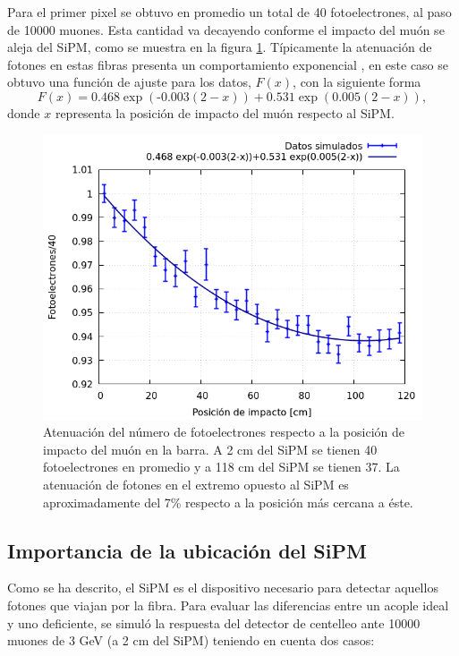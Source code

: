 \documentclass[12pt,oneside,openany,letter]{book}
\begin{document}
Para el primer pixel se obtuvo en promedio un total de 40 fotoelectrones, al paso de 10000 muones. Esta cantidad va decayendo conforme el impacto del muón se aleja del SiPM, como se muestra en la figura \ref{atenuacion_barra}. Típicamente la atenuación de fotones en estas fibras presenta un comportamiento exponencial \cite{Gonzalez-maestrando2012}, en este caso se obtuvo una función de ajuste para los datos, $F(x)$, con la siguiente forma
\begin{equation}
F(x)= \text{0.468} \exp(\text{-0.003}(2-x))+\text{0.531} \exp(\text{0.005}(2-x)),
\end{equation}
donde $x$ representa la posición de impacto del muón respecto al SiPM.
\begin{figure}[h!]
    \centering
        \includegraphics[scale=0.55]{atenuacion_barra_2.png}
   \caption[Atenuación del número de fotoelectrones respecto a la posición de impacto del muón en la barra]{Atenuación del número de fotoelectrones respecto a la posición de impacto del muón en la barra. A 2 cm del SiPM se tienen 40 fotoelectrones en promedio y a 118 cm del SiPM se tienen 37. La atenuaci\'on de fotones en el extremo opuesto al SiPM es aproximadamente del 7\% respecto a la posici\'on m\'as cercana a \'este.}\label{atenuacion_barra}
\end{figure}

\subsection{Importancia de la ubicación del SiPM}
Como se ha descrito, el SiPM es el dispositivo necesario para detectar aquellos fotones que viajan por la fibra. Para evaluar las diferencias entre un acople ideal y uno deficiente, se simuló la respuesta del detector de centelleo ante 10000 muones de 3 GeV (a 2 cm del SiPM) teniendo en cuenta dos casos:
\end{document}
